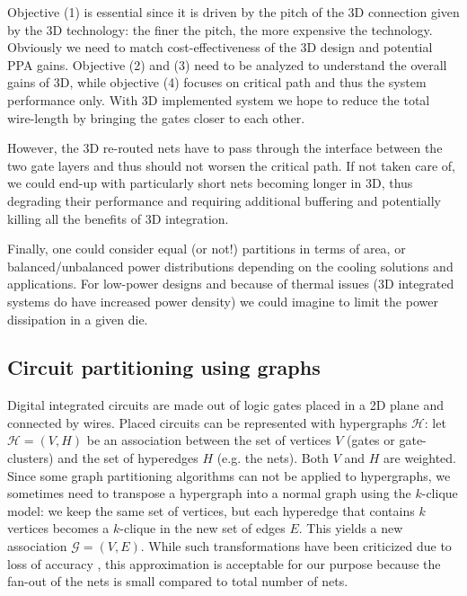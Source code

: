 \documentclass[conference]{IEEEtran}
\begin{document}
Objective (1) is essential since it is driven by the pitch of the 3D connection given by the 3D technology: the finer the pitch, the more expensive the technology. Obviously we need to match cost-effectiveness of the 3D design and potential PPA gains. Objective (2) and (3) need to be analyzed to understand the overall gains of 3D, while objective (4) focuses on critical path and thus the system performance only. With 3D implemented system we hope to reduce the total wire-length by bringing the gates closer to each other. 

However, the 3D re-routed nets have to pass through the interface between the two gate layers and thus should not worsen the critical path. If not taken care of, we could end-up with particularly short nets becoming longer in 3D, thus degrading their performance and requiring additional buffering and potentially killing all the benefits of 3D integration.

Finally, one could consider equal (or not!) partitions in terms of area, or balanced/unbalanced power distributions depending on the cooling solutions and applications. For low-power designs and because of thermal issues (3D integrated systems do have increased power density) we could imagine to limit the power dissipation in a given die.

\subsection{Circuit partitioning using graphs}\label{sec:partitioning}
Digital integrated circuits are made out of logic gates placed in a 2D plane and connected by wires. Placed circuits can be represented with hypergraphs $\mathcal{H}$: let $\mathcal{H} = (V, H)$ be an association between the set of vertices $V$ (gates or gate-clusters) and the set of hyperedges $H$ (e.g. the nets). Both $V$ and $H$ are weighted. Since some graph partitioning algorithms can not be applied to hypergraphs, we sometimes need to transpose a hypergraph into a normal graph using the $k$-clique model: we keep the same set of vertices, but each hyperedge that contains $k$ vertices becomes a $k$-clique in the new set of edges $E$. This yields a new association $\mathcal{G} = (V, E)$. While such transformations have been criticized  due to loss of accuracy \cite{IhlerEdmund;WagnerDorothea;Wagner1993}, this approximation is acceptable for our purpose because the fan-out of the nets is small compared to total number of nets.
\end{document}
